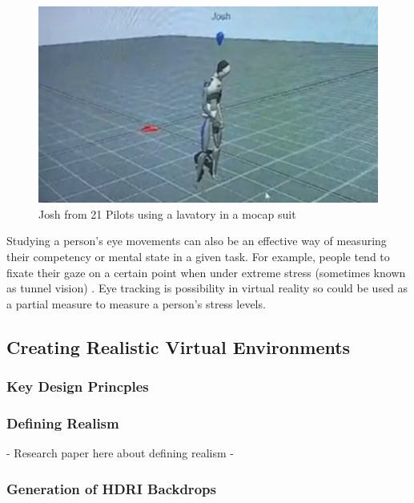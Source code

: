 \documentclass[12pt]{article}
\begin{document}
\begin{figure}[h]
  \centering
  \begin{minipage}[b]{0.7\linewidth}
    \includegraphics[width=\linewidth]{images/josh-mocap-concert.png}
    \caption{Josh from 21 Pilots using a lavatory in a mocap suit}
    \label{fig:joshmocapconcert}
  \end{minipage}
\end{figure}

Studying a person's eye movements can also be an effective way of measuring their competency or mental state in a given task. For example, people tend to fixate their gaze on a certain point when under extreme stress (sometimes known as tunnel vision) \cite{herten2017role}. Eye tracking is possibility in virtual reality \cite{clay2019eye} so could be used as a partial measure to measure a person's stress levels. 

\subsection{Creating Realistic Virtual Environments}

\subsubsection{Key Design Princples}

\subsubsection{Defining Realism}

- Research paper here about defining realism -

\subsubsection{Generation of HDRI Backdrops}
\end{document}
